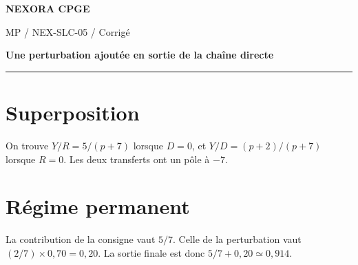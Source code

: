 \documentclass[11pt,a4paper]{article}
\begin{document}
{\small\bfseries\color{nexorablue} NEXORA CPGE}\par
{\small MP / NEX-SLC-05 / Corrigé}\par
{\LARGE\bfseries Une perturbation ajoutée en sortie de la chaîne directe}\par
\vspace{0.25em}\hrule\vspace{0.6em}

\section*{Superposition}
On trouve $Y/R=5/(p+7)$ lorsque $D=0$, et $Y/D=(p+2)/(p+7)$ lorsque $R=0$. Les deux transferts ont un pôle à $-7$.

\section*{Régime permanent}
La contribution de la consigne vaut $5/7$. Celle de la perturbation vaut $(2/7)\times0{,}70=0{,}20$. La sortie finale est donc $5/7+0{,}20\simeq0{,}914$.
\end{document}
